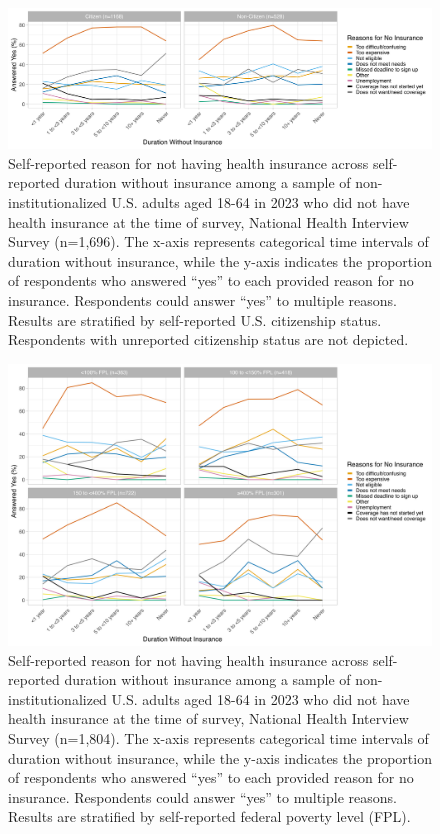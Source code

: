 \documentclass[12pt]{article}
\begin{document}
\begin{figure}[H]
  \centering
  \includegraphics[width=15cm]{figures/duration_no_insurance_by_reason_by_citizen.png}
  \caption{Self-reported reason for not having health insurance across self-reported duration without insurance among a sample of non-institutionalized U.S. adults aged 18-64 in 2023 who did not have health insurance at the time of survey, National Health Interview Survey (n=1,696). The x-axis represents categorical time intervals of duration without insurance, while the y-axis indicates the proportion of respondents who answered “yes” to each provided reason for no insurance. Respondents could answer “yes” to multiple reasons. Results are stratified by self-reported U.S. citizenship status. Respondents with unreported citizenship status are not depicted.}
\end{figure}

\begin{figure}[H]
  \centering
  \includegraphics[width=15cm]{figures/duration_no_insurance_by_reason_by_fpl.png}
  \caption{Self-reported reason for not having health insurance across self-reported duration without insurance among a sample of non-institutionalized U.S. adults aged 18-64 in 2023 who did not have health insurance at the time of survey, National Health Interview Survey (n=1,804). The x-axis represents categorical time intervals of duration without insurance, while the y-axis indicates the proportion of respondents who answered “yes” to each provided reason for no insurance. Respondents could answer “yes” to multiple reasons. Results are stratified by self-reported federal poverty level (FPL).}
\end{figure}
\end{document}
